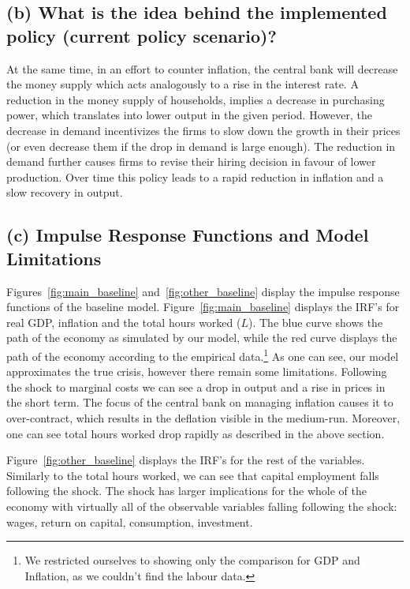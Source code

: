 \documentclass[12pt]{article}
\begin{document}
\subsection*{(b) What is the idea behind the implemented policy (current policy scenario)?}

At the same time, in an effort to counter inflation, the central bank will decrease the money supply which acts analogously to a rise in the interest rate. A reduction in the money supply of households, implies a decrease in purchasing power, which translates into lower output in the given period. However, the decrease in demand incentivizes the firms to slow down the growth in their prices (or even decrease them if the drop in demand is large enough). The reduction in demand further causes firms to revise their hiring decision in favour of lower production. Over time this policy leads to a rapid reduction in inflation and a slow recovery in output.

\subsection*{(c) Impulse Response Functions and Model Limitations}

Figures~\ref{fig:main_baseline} and~\ref{fig:other_baseline} display the impulse response functions of the baseline model. Figure~\ref{fig:main_baseline} displays the IRF's for real GDP, inflation and the total hours worked ($L$). The blue curve shows the path of the economy as simulated by our model, while the red curve displays the path of the economy according to the empirical data.\footnote{We restricted ourselves to showing only the comparison for GDP and Inflation, as we couldn't find the labour data.} As one can see, our model approximates the true crisis, however there remain some limitations. Following the shock to marginal costs we can see a drop in output and a rise in prices in the short term. The focus of the central bank on managing inflation causes it to over-contract, which results in the deflation visible in the medium-run. Moreover, one can see total hours worked drop rapidly as described in the above section. 

Figure~\ref{fig:other_baseline} displays the IRF's for the rest of the variables. Similarly to the total hours worked, we can see that capital employment falls following the shock. The shock has larger implications for the whole of the economy with virtually all of the observable variables falling following the shock: wages, return on capital, consumption, investment. 
\end{document}
